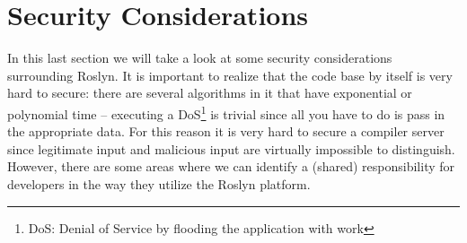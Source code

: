 \section{Security Considerations}
\label{sec:security}

In this last section we will take a look at some security considerations surrounding Roslyn. It is important to realize that the code base by itself is very hard to secure: there are several algorithms in it that have exponential or polynomial time -- executing a DoS\footnote{DoS: Denial of Service by flooding the application with work} is trivial since all you have to do is pass in the appropriate data. For this reason it is very hard to secure a compiler server\parencite{Gocke2015} since legitimate input and malicious input are virtually impossible to distinguish. However, there are some areas where we can identify a (shared) responsibility for developers in the way they utilize the Roslyn platform.


